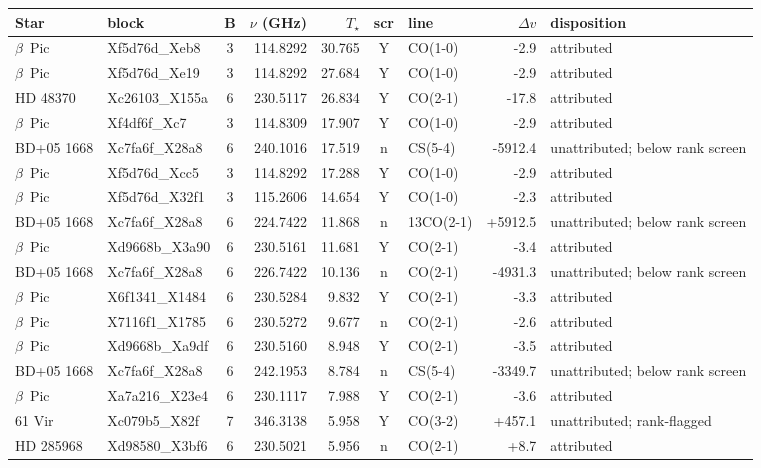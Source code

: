 \begin{tabular}{@{}l@{~}l@{~}c@{~}r@{~}r@{~}c@{~}l@{~}r@{~}l@{}}
\hline
Star & block & B & $\nu$ (GHz) & $T_\star$ & scr & line & $\Delta v$ & disposition \\
\hline
$\beta$~Pic & Xf5d76d\_Xeb8 & 3 & 114.8292 & 30.765 & Y & CO(1-0) & -2.9 & attributed \\
$\beta$~Pic & Xf5d76d\_Xe19 & 3 & 114.8292 & 27.684 & Y & CO(1-0) & -2.9 & attributed \\
HD 48370 & Xc26103\_X155a & 6 & 230.5117 & 26.834 & Y & CO(2-1) & -17.8 & attributed \\
$\beta$~Pic & Xf4df6f\_Xc7 & 3 & 114.8309 & 17.907 & Y & CO(1-0) & -2.9 & attributed \\
BD+05 1668 & Xc7fa6f\_X28a8 & 6 & 240.1016 & 17.519 & n & CS(5-4) & -5912.4 & unattributed; below rank screen \\
$\beta$~Pic & Xf5d76d\_Xcc5 & 3 & 114.8292 & 17.288 & Y & CO(1-0) & -2.9 & attributed \\
$\beta$~Pic & Xf5d76d\_X32f1 & 3 & 115.2606 & 14.654 & Y & CO(1-0) & -2.3 & attributed \\
BD+05 1668 & Xc7fa6f\_X28a8 & 6 & 224.7422 & 11.868 & n & 13CO(2-1) & +5912.5 & unattributed; below rank screen \\
$\beta$~Pic & Xd9668b\_X3a90 & 6 & 230.5161 & 11.681 & Y & CO(2-1) & -3.4 & attributed \\
BD+05 1668 & Xc7fa6f\_X28a8 & 6 & 226.7422 & 10.136 & n & CO(2-1) & -4931.3 & unattributed; below rank screen \\
$\beta$~Pic & X6f1341\_X1484 & 6 & 230.5284 & 9.832 & Y & CO(2-1) & -3.3 & attributed \\
$\beta$~Pic & X7116f1\_X1785 & 6 & 230.5272 & 9.677 & n & CO(2-1) & -2.6 & attributed \\
$\beta$~Pic & Xd9668b\_Xa9df & 6 & 230.5160 & 8.948 & Y & CO(2-1) & -3.5 & attributed \\
BD+05 1668 & Xc7fa6f\_X28a8 & 6 & 242.1953 & 8.784 & n & CS(5-4) & -3349.7 & unattributed; below rank screen \\
$\beta$~Pic & Xa7a216\_X23e4 & 6 & 230.1117 & 7.988 & Y & CO(2-1) & -3.6 & attributed \\
61 Vir & Xc079b5\_X82f & 7 & 346.3138 & 5.958 & Y & CO(3-2) & +457.1 & unattributed; rank-flagged \\
HD 285968 & Xd98580\_X3bf6 & 6 & 230.5021 & 5.956 & n & CO(2-1) & +8.7 & attributed \\

\end{tabular}
